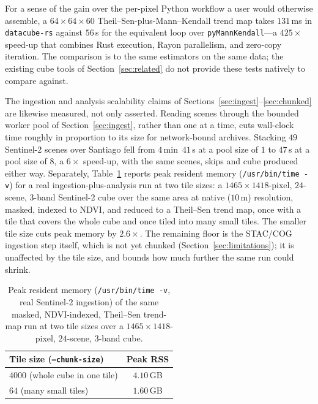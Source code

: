 \documentclass[review]{elsarticle}
\begin{document}
For a sense of the gain over the per-pixel Python workflow a user would
otherwise assemble, a $64\times64\times60$ Theil--Sen-plus-Mann--Kendall trend
map takes $131$\,ms in \texttt{datacube-rs} against $56$\,s for the equivalent
loop over \texttt{pyMannKendall}---a $425\times$ speed-up that combines Rust
execution, Rayon parallelism, and zero-copy iteration. The comparison is to the
same estimators on the same data; the existing cube tools of
Section~\ref{sec:related} do not provide these tests natively to compare
against.

The ingestion and analysis scalability claims of
Sections~\ref{sec:ingest}--\ref{sec:chunked} are likewise measured, not only
asserted. Reading scenes through the bounded worker pool of
Section~\ref{sec:ingest}, rather than one at a time, cuts wall-clock time
roughly in proportion to its size for network-bound archives. Stacking $49$
Sentinel-2 scenes over Santiago fell from $4$\,min~$41$\,s at a pool size of
$1$ to $47$\,s at a pool size of $8$, a $6\times$ speed-up, with the same
scenes, skips and cube produced either way. Separately, Table~\ref{tab:memory}
reports peak resident memory (\texttt{/usr/bin/time -v}) for a real
ingestion-plus-analysis run at two tile sizes: a $1465\times1418$-pixel,
$24$-scene, $3$-band Sentinel-2 cube over the same area at native
($10$\,m) resolution, masked, indexed to NDVI, and reduced to a Theil--Sen
trend map, once with a tile that covers the whole cube and once tiled into
many small tiles. The smaller tile size cuts peak memory by $2.6\times$. The
remaining floor is the STAC/COG ingestion step itself, which is not yet
chunked (Section~\ref{sec:limitations}); it is unaffected by the tile size,
and bounds how much further the same run could shrink.

\begin{table}[t]
\centering
\caption{Peak resident memory (\texttt{/usr/bin/time -v}, real Sentinel-2
ingestion) of the same masked, NDVI-indexed, Theil--Sen trend-map run at two
tile sizes over a $1465\times1418$-pixel, $24$-scene, $3$-band cube.}
\label{tab:memory}
\small
\begin{tabular}{@{}lc@{}}
\toprule
Tile size (\texttt{--chunk-size}) & Peak RSS \\
\midrule
$4000$ (whole cube in one tile) & $4.10$\,GB \\
$64$ (many small tiles)         & $1.60$\,GB \\
\bottomrule
\end{tabular}
\end{table}
\end{document}
